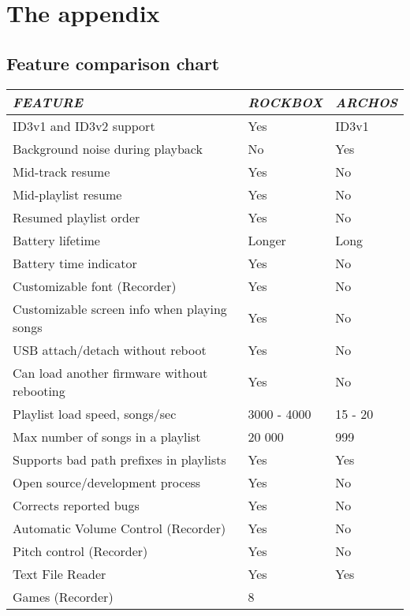 \appendix
\chapter{The appendix}
\section{Feature comparison chart}
\begin{tabular}[c]{|p{10.382cm}|p{2.799cm}|p{2.411cm}|}
\hline
{\centering\bfseries\itshape
FEATURE
\par}
&
{\centering\bfseries\itshape
ROCKBOX
\par}
&
{\centering\bfseries\itshape
ARCHOS
\par}
\\\hline
\endhead
ID3v1 and ID3v2 support 
&
Yes 
&
ID3v1 
\\\hline
Background noise during playback 
&
No 
&
Yes 
\\\hline
Mid{}-track resume 
&
Yes 
&
No 
\\\hline
Mid{}-playlist resume 
&
Yes 
&
No 
\\\hline
Resumed playlist order 
&
Yes 
&
No 
\\\hline
Battery lifetime 
&
Longer 
&
Long 
\\\hline
Battery time indicator 
&
Yes 
&
No 
\\\hline
Customizable font (Recorder) 
&
Yes 
&
No 
\\\hline
Customizable screen info when playing songs 
&
Yes 
&
No 
\\\hline
USB attach/detach without reboot 
&
Yes 
&
No 
\\\hline
Can load another firmware without rebooting 
&
Yes 
&
No 
\\\hline
Playlist load speed, songs/sec 
&
3000 {}- 4000 
&
15 {}- 20 
\\\hline
Max number of songs in a playlist 
&
20 000 
&
999 
\\\hline
Supports bad path prefixes in playlists 
&
Yes 
&
Yes 
\\\hline
Open source/development process 
&
Yes 
&
No 
\\\hline
Corrects reported bugs 
&
Yes 
&
No 
\\\hline
Automatic Volume Control (Recorder) 
&
Yes 
&
No 
\\\hline
Pitch control (Recorder) 
&
Yes 
&
No 
\\\hline
Text File Reader 
&
Yes 
&
Yes 
\\\hline
Games (Recorder) 
&
8 

\end{tabular}

